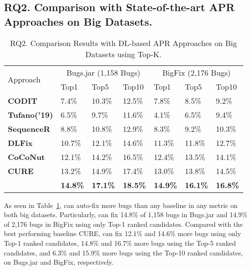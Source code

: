 \subsection{\bf RQ2. Comparison with State-of-the-art APR Approaches on Big Datasets.}

\begin{table}[t]
	\caption{RQ2. Comparison Results with DL-based APR Approaches on Big Datasets using Top-K.}
	\vspace{-10pt}
	\begin{center}
		\renewcommand{\arraystretch}{1}
		\begin{tabular}{p{1.6cm}|p{0.7cm}|p{0.7cm}|p{0.7cm}|p{0.7cm}|p{0.7cm}|p{0.7cm}}\hline
			\multirow{2}{*}{Approach}&\multicolumn{3}{c|}{Bugs.jar (1,158 Bugs)}&\multicolumn{3}{c}{BigFix (2,176 Bugs)}\\\cline{2-7}
		                          & Top1   & Top5   & Top10  & Top1   & Top5   & Top10\\
			\hline
			\textbf{CODIT}        & 7.4\%  & 10.3\% & 12.5\% & 7.8\%  & 8.5\%  & 9.2\%\\
			\textbf{Tufano('19)}  & 6.5\%  & 9.7\%  & 11.6\% & 4.1\%  & 6.5\%  & 9.4\%\\
			\textbf{SequenceR}    & 8.8\%  & 10.8\% & 12.9\% & 8.3\%  & 9.2\%  & 10.3\%\\
			\textbf{DLFix}        & 10.7\% & 12.1\% & 14.6\% & 11.3\% & 11.8\% & 12.7\%\\
			\textbf{CoCoNut}      & 12.1\% & 14.2\% & 16.5\% & 12.4\% & 13.5\% & 14.1\%\\
			\textbf{CURE}         & 13.2\% & 14.9\% & 17.4\% & 13.0\% & 13.8\% & 14.5\%\\
			\hline
			\textbf{\tool}        & \textbf{14.8\%} & \textbf{17.1\%} & \textbf{18.5\%} & \textbf{14.9\%} & \textbf{16.1\%} & \textbf{16.8\%}\\
			\hline
		\end{tabular}
		\label{RQ2_results}
	\end{center}
\end{table}


As seen in Table~\ref{RQ2_results}, {\tool} can auto-fix more bugs than any baseline in any metric on both big datasets. 
Particularly, {\tool} can fix 14.8\% of 1,158 bugs in Bugs.jar and 14.9\% of 2,176 bugs in BigFix using only Top-1 ranked candidates. Compared with the best performing baseline CURE, {\tool} can 
fix 12.1\% and 14.6\% more bugs using only Top-1 ranked candidates,  14.8\% and 16.7\% more bugs using the Top-5 ranked candidates, and 6.3\% and 15.9\% more bugs using the Top-10 ranked candidates, on Bugs.jar and BigFix, respectively. 
